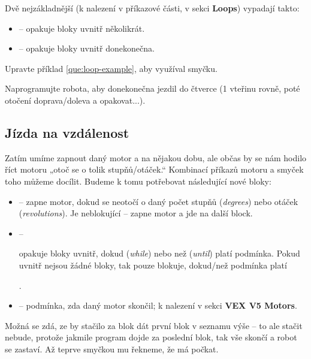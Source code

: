 \documentclass[../main.tex]{subfiles}
\begin{document}
	Dvě nejzákladnější (k nalezení v příkazové části, v sekci \textbf{Loops}) vypadají takto:
	\begin{itemize}
		\item[\block]  -- opakuje bloky uvnitř několikrát.
		\item[\block]  -- opakuje bloky uvnitř donekonečna.
	\end{itemize}

	\begin{question}
		Upravte příklad \ref{que:loop-example}, aby využíval smyčku.
	\end{question}

	\begin{question}
		Naprogramujte robota, aby donekonečna jezdil do čtverce (1 vteřinu rovně, poté otočení doprava/doleva a opakovat...).
	\end{question}

	\subsection{Jízda na vzdálenost}\label{cha:distanceride}
	Zatím umíme zapnout daný motor a na nějakou dobu, ale občas by se nám hodilo říct motoru „otoč se o tolik stupňů/otáček.“ Kombinací příkazů motoru a smyček toho můžeme docílit. Budeme k tomu potřebovat následující nové bloky:
	\begin{itemize}
		\item[\block]  -- zapne motor, dokud se neotočí o daný počet stupňů (\textit{degrees}) nebo otáček (\textit{revolutions}). Je neblokující -- zapne motor a jde na další block.
		\item[\block]  -- \parbox{0.725\textwidth}{opakuje bloky uvnitř, dokud (\textit{while}) nebo než (\textit{until}) platí podmínka. Pokud uvnitř nejsou žádné bloky, tak pouze blokuje, dokud/než podmínka platí}.
		\item[\block]  -- podmínka, zda daný motor skončil; k nalezení v sekci \textbf{VEX V5 Motors}.
	\end{itemize}

	Možná se zdá, ze by stačilo za  blok dát první blok v seznamu výše -- to ale stačit nebude, protože jakmile program dojde za poslední blok, tak vše skončí a robot se zastaví. Až teprve smyčkou mu řekneme, že má počkat.
\end{document}
